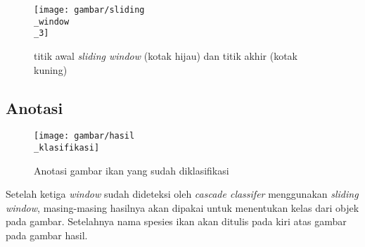 \begin{figure}[H]
  \centering{}
	\texttt{[image: gambar/sliding\\\_window\\\_3]}
  \caption{titik awal \textit{sliding window} (kotak hijau) dan titik akhir (kotak kuning)}
\end{figure}

\subsection{Anotasi}

\begin{figure}[H]
  \centering{}
	\texttt{[image: gambar/hasil\\\_klasifikasi]}
  \caption{Anotasi gambar ikan yang sudah diklasifikasi}
\end{figure}

Setelah ketiga \textit{window} sudah dideteksi oleh \emph{cascade classifer} 
menggunakan \textit{sliding window}, masing-masing hasilnya akan dipakai 
untuk menentukan kelas dari objek pada gambar. Setelahnya nama 
spesies ikan akan ditulis pada kiri atas gambar pada gambar hasil.


